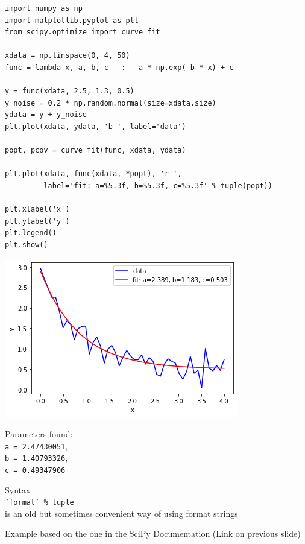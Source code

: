 \begin{frame}[fragile]
%
\begin{codebox}[Example: Curve Fitting, width=.73\linewidth, nobeforeafter, equal height group=grpCurveFit]
\begin{verbatim}
import numpy as np
import matplotlib.pyplot as plt
from scipy.optimize import curve_fit

xdata = np.linspace(0, 4, 50)
func = lambda x, a, b, c   :   a * np.exp(-b * x) + c

y = func(xdata, 2.5, 1.3, 0.5)
y_noise = 0.2 * np.random.normal(size=xdata.size)
ydata = y + y_noise
plt.plot(xdata, ydata, 'b-', label='data')

popt, pcov = curve_fit(func, xdata, ydata)

plt.plot(xdata, func(xdata, *popt), 'r-',
         label='fit: a=%5.3f, b=%5.3f, c=%5.3f' % tuple(popt))

plt.xlabel('x')
plt.ylabel('y')
plt.legend()
plt.show()
\end{verbatim}
\end{codebox}
%
\begin{tcolorbox}[title=Output, width=.26\linewidth, nobeforeafter, equal height group=grpCurveFit]
	\includegraphics[width=\linewidth]{./gfx/sciPy-curve-fit}
	
	\vspace{6pt}
	\scriptsize
	Parameters found:\\
	\texttt{a = 2.47430051},\\
	\texttt{b = 1.40793326},\\
	\texttt{c = 0.49347906}
	
	\vspace{6pt}
	Syntax\\
	\texttt{'format' \% tuple}\\
	is an old but sometimes convenient way of using format strings
	
	\vspace{6pt}
	Example based on the one in the SciPy Documentation (Link on previous slide)
\end{tcolorbox}
%
\end{frame}

